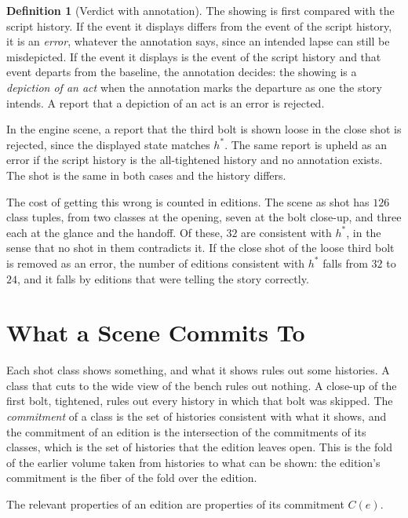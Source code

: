 \documentclass[11pt,twoside,openright]{book}
\theoremstyle{plain}
\theoremstyle{definition}
\newtheorem{definition}[theorem]{Definition}
\theoremstyle{remark}
\begin{document}
\begin{definition}[Verdict with annotation]\label{def:annverdict}
The showing is first compared with the script history. If the event it displays differs from the event of the script history, it is an \emph{error}, whatever the annotation says, since an intended lapse can still be misdepicted. If the event it displays is the event of the script history and that event departs from the baseline, the annotation decides: the showing is a \emph{depiction of an act} when the annotation marks the departure as one the story intends. A report that a depiction of an act is an error is rejected.
\end{definition}

In the engine scene, a report that the third bolt is shown loose in the close shot is rejected, since the displayed state matches $h^\ast$. The same report is upheld as an error if the script history is the all-tightened history and no annotation exists. The shot is the same in both cases and the history differs.

The cost of getting this wrong is counted in editions. The scene as shot has $126$ class tuples, from two classes at the opening, seven at the bolt close-up, and three each at the glance and the handoff. Of these, $32$ are consistent with $h^\ast$, in the sense that no shot in them contradicts it. If the close shot of the loose third bolt is removed as an error, the number of editions consistent with $h^\ast$ falls from $32$ to $24$, and it falls by editions that were telling the story correctly.

\section{What a Scene Commits To}\label{sec:commits}

Each shot class shows something, and what it shows rules out some histories. A class that cuts to the wide view of the bench rules out nothing. A close-up of the first bolt, tightened, rules out every history in which that bolt was skipped. The \emph{commitment} of a class is the set of histories consistent with what it shows, and the commitment of an edition is the intersection of the commitments of its classes, which is the set of histories that the edition leaves open. This is the fold of the earlier volume taken from histories to what can be shown: the edition's commitment is the fiber of the fold over the edition.

The relevant properties of an edition are properties of its commitment $C(e)$.
\end{document}
